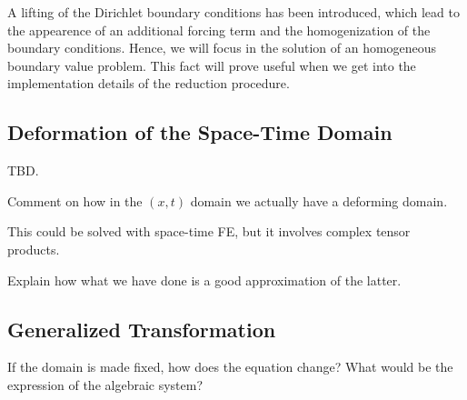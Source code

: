 \documentclass[../../thesis.tex]{subfiles}
\begin{document}
A lifting of the Dirichlet boundary conditions has been introduced, which lead to the appearence of an additional forcing term and the homogenization of the boundary conditions.
Hence, we will focus in the solution of an homogeneous boundary value problem.
This fact will prove useful when we get into the implementation details of the reduction procedure.

\subsection{Deformation of the Space-Time Domain}
TBD.

Comment on how in the $(x,t)$ domain we actually have a deforming domain. 

This could be solved with space-time FE, but it involves complex tensor products. 

Explain how what we have done is a good approximation of the latter.

\subsection{Generalized Transformation}
If the domain is made fixed, 
how does the equation change?
What would be the expression of the algebraic system?
\end{document}

